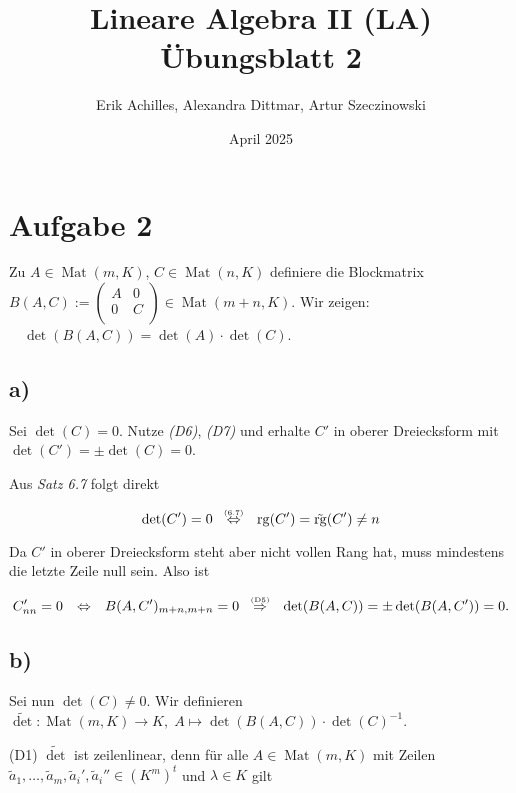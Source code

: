 \documentclass{article}
\title{Lineare Algebra II (LA) Übungsblatt 2}
\author{Erik Achilles, Alexandra Dittmar, Artur Szeczinowski}
\date{April 2025}
\newcommand{\imp}{\mathbb{\Rightarrow}}
\newcommand{\equ}{\mathbb{\Leftrightarrow}}
\DeclareMathOperator{\Mat}{Mat}
\DeclareMathOperator{\rg}{rg}
\newcommand{\movs}[2]{\overset{\text{\tiny $#1$}}{\quad #2 \quad}}
\newcommand{\tovs}[2]{\overset{\text{\tiny (#1)}}{\quad #2 \quad}}
\begin{document}
\section*{Aufgabe 2}

Zu
$A \in \Mat(m, K)$,
$C \in \Mat(n, K)$
definiere die Blockmatrix
$
B(A, C) := 
\begin{pmatrix*}
    A & 0 \\
    0 & C \\
\end{pmatrix*}
\in \Mat(m + n, K).
$
Wir zeigen:
$ \quad \det(B(A, C)) = \det(A) \cdot \det(C)$.


\subsection*{a)}
Sei
$\det(C) = 0$.
Nutze
\textit{(D6)}, \textit{(D7)}
und erhalte
$C'$
in oberer Dreiecksform mit
$\det(C')= \pm \det(C)= 0$. 

Aus
\textit{Satz 6.7}
folgt direkt

\[
\det(C') = 0
\tovs{6.7}{\equ}
\rg(C') = \tilde{\rg}(C') \neq n
\]

Da
$C'$
in oberer Dreiecksform steht
aber nicht vollen Rang hat,
muss mindestens die letzte Zeile null sein.
Also ist

\[
C'_{nn} = 0
\movs{}{\equ}
B(A, C')_{m+n,m+n} = 0
\tovs{D5}{\imp}
\det(B(A, C)) = \pm \det(B(A, C')) = 0.
\]


\subsection*{b)}
Sei nun
$\det(C) \neq 0$.
Wir definieren
$\widetilde{\det} : \Mat(m, K) \to K, \; A \mapsto \det(B(A, C)) \cdot \det(C)^{-1}$.

\bigbreak
(D1) $\widetilde{\det}$ ist zeilenlinear, denn für alle
$A \in \Mat(m, K)$
mit Zeilen
$\tilde{a}_1, \dots, \tilde{a}_m, \tilde{a}_i', \tilde{a}_i'' \in (K^m)^t$
und
$\lambda \in K$
gilt
\end{document}
